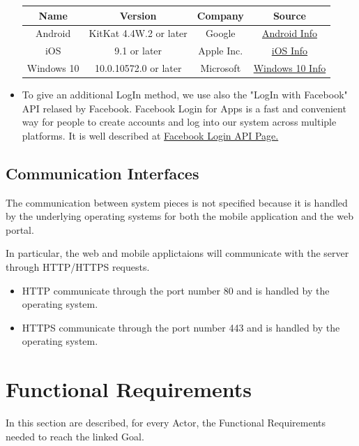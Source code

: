 \documentclass{report}
\begin{document}
\begin{itemize}
\begin{center}
\begin{table}[h!]
\begin{center}
								\begin{tabular}{cccc}
									\toprule
									\textbf{Name} & \textbf{Version} & \textbf{Company} & \textbf{Source}\\
									\midrule
									Android & KitKat 4.4W.2 or later & Google & \href{https://www.android.com}{Android Info}\\
									\midrule
									iOS & 9.1 or later & Apple Inc. & \href{http://www.apple.com/ios/}{iOS Info}\\
									\midrule
									Windows 10 & 10.0.10572.0 or later & Microsoft & \href{http://www.microsoft.com/it-it/mobile/windows10/?dcmpid=omc-org-globalsite.globalredirect}{Windows 10 Info}\\
									\bottomrule
								\end{tabular}
							\end{center}
							
						\end{table}
					\end{center}

				\item To give an additional LogIn method, we use also the "LogIn with Facebook" API relased by Facebook. Facebook Login for Apps is a fast and convenient way for people to create accounts and log into our system across multiple platforms. It is well described at \href{https://developers.facebook.com/docs/facebook-login}{Facebook Login API Page.}
			\end{itemize}


		\subsection{Communication Interfaces}
		The communication between system pieces is not specified because it is handled by the underlying operating systems for both the mobile application and the web portal.

		In particular, the web and mobile applictaions will communicate with the server through HTTP/HTTPS requests. 

			\begin{itemize}
				\item HTTP communicate through the port number 80 and is handled by the operating system. 
				\item HTTPS communicate through the port number 443 and is handled by the operating system.
			\end{itemize}

	
\section{Functional Requirements}
	In this section are described, for every Actor, the Functional Requirements needed to reach the linked Goal.
\end{document}
